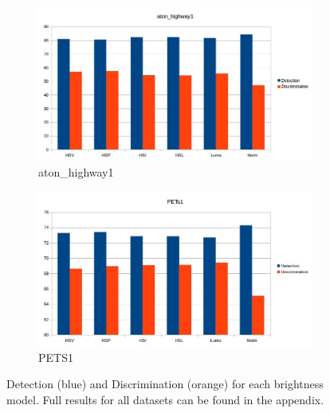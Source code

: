 \documentclass[12pt]{report}
\begin{document}
\begin{figure}
\centering
  \begin{subfigure}{1\linewidth}
  \includegraphics[width=1\linewidth]{figures/model/highway1_all_brightness_models.jpg}
  \caption{aton\_highway1}
\end{subfigure}
\hfill
  \begin{subfigure}{1\linewidth}
  \includegraphics[width=1\linewidth]{figures/model/pets1_all_brightness_models.jpg}
  \caption{PETS1}
\end{subfigure}
\caption{Detection (blue) and Discrimination (orange) for each brightness model. Full results for all datasets can be found in the appendix.}
\label{fig:pets1_bars_calc_all}
\end{figure}
\end{document}

